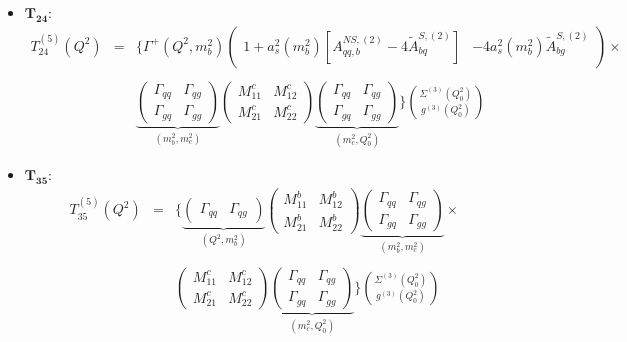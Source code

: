 \documentclass[10pt,a4paper]{article}
\begin{document}
\begin{itemize}
\item $\mathbf{T_{24}}$:
\begin{equation}
\begin{array}{rcl}
\displaystyle T_{24}^{(5)}(Q^2)&=&\Bigg\{\Gamma^{+}(Q^2,m_b^2)\begin{pmatrix} 1+a_s^2(m_b^2)[A_{qq,b}^{N\!S,(2)}-4\tilde{A}^{S,(2)}_{bq}] & -4a_s^2(m_b^2)\tilde{A}^{S,(2)}_{bg}\end{pmatrix}\times\\
\\
 & & \displaystyle \underbrace{\begin{pmatrix}\Gamma_{qq}& \Gamma_{qg} \\ \Gamma_{gq} & \Gamma_{gg}\end{pmatrix}}_{(m_b^2,m_c^2)}\begin{pmatrix} M^c_{11} & M^c_{12} \\ M_{21}^c & M_{22}^c \end{pmatrix}\underbrace{\begin{pmatrix}\Gamma_{qq}& \Gamma_{qg} \\ \Gamma_{gq} & \Gamma_{gg}\end{pmatrix}}_{(m_c^2,Q_0^2)}\Bigg\}{\Sigma^{(3)}(Q_0^2) \choose g^{(3)}(Q_0^2)}
\end{array}
\end{equation}
\item $\mathbf{T_{35}}$:
\begin{equation}
\begin{array}{rcl}
T_{35}^{(5)}(Q^2) &=&\displaystyle \Bigg\{\underbrace{\begin{pmatrix} \Gamma_{qq} & \Gamma_{qg}\end{pmatrix}}_{(Q^2,m_b^2)}\begin{pmatrix} M_{11}^b & M_{12}^b \\ M_{21}^b & M_{22}^b\end{pmatrix}\underbrace{\begin{pmatrix} \Gamma_{qq} & \Gamma_{qg} \\ \Gamma_{gq}& \Gamma_{gg}\end{pmatrix}}_{(m_b^2,m_c^2)}\times\\
\\
& & \displaystyle \begin{pmatrix} M^c_{11} & M^c_{12} \\ M_{21}^c & M_{22}^c \end{pmatrix}\underbrace{\begin{pmatrix}\Gamma_{qq}& \Gamma_{qg} \\ \Gamma_{gq} & \Gamma_{gg}\end{pmatrix}}_{(m_c^2,Q_0^2)}\Bigg\} {\Sigma^{(3)}(Q_0^2) \choose g^{(3)}(Q_0^2)}
\end{array}
\end{equation}
\end{itemize}
\end{document}
